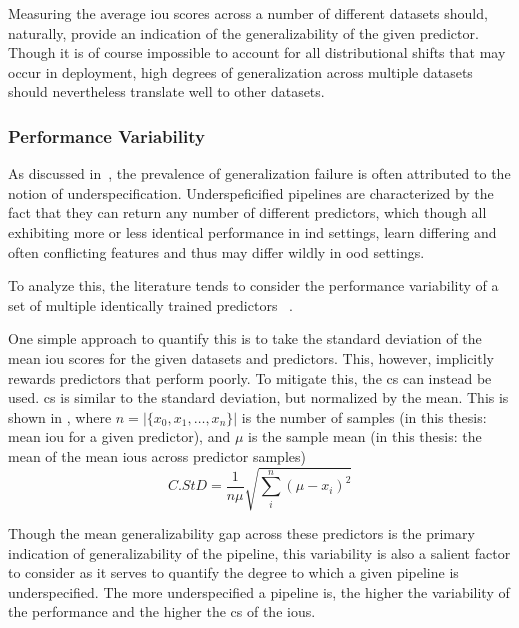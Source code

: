     Measuring the average \gls{iou} scores across a number of different datasets should, naturally, provide an indication of the generalizability of the given predictor. Though it is of course impossible to account for all distributional shifts that may occur in deployment, high degrees of generalization across multiple datasets should nevertheless translate well to other datasets. 

    
    \subsubsection{Performance Variability}
    As discussed in~, the prevalence of generalization failure is often attributed to the notion of underspecification. Underspeficified pipelines are characterized by the fact that they can return any number of different predictors, which though all exhibiting more or less identical performance in \gls{ind} settings, learn differing and often conflicting features and thus may differ wildly in \gls{ood} settings. 
    
    To analyze this, the literature tends to consider the performance variability of a set of multiple identically trained predictors ~\cite{damour2020underspecification}.  
    
    One simple approach to quantify this is to take the standard deviation of the mean \gls{iou} scores for the given datasets and predictors. This, however, implicitly rewards predictors that perform poorly. To mitigate this, the \gls{cs} can instead be used. \gls{cs} is similar to the standard deviation, but normalized by the mean. This is shown in , where \(n=|\{x_0, x_1, \ldots, x_n\}|\) is the number of samples (in this thesis: mean \gls{iou} for a given predictor), and \(\mu\) is the sample mean (in this thesis: the mean of the mean \glspl{iou} across predictor samples)
    \begin{equation}\label{cstd}
        C.StD = \frac{1}{n \mu} \sqrt{ \sum_i^n (\mu - x_i)^2  }
    \end{equation}
    
     Though the mean generalizability gap across these predictors is the primary indication of generalizability of the pipeline, this variability is also a salient factor to consider as it serves to quantify the degree to which a given pipeline is underspecified. The more underspecified a pipeline is, the higher the variability of the performance and the higher the \gls{cs} of the \glspl{iou}.  

